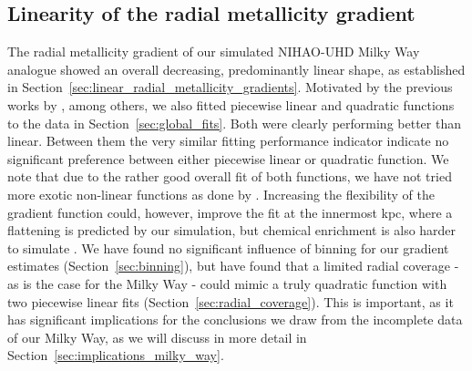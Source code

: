 \documentclass[fleqn,usenatbib]{mnras}
\begin{document}
\subsection{Linearity of the radial metallicity gradient} \label{sec:discussion_linearity}

The radial metallicity gradient of our simulated NIHAO-UHD Milky Way analogue showed an overall decreasing, predominantly linear shape, as established in Section~\ref{sec:linear_radial_metallicity_gradients}. Motivated by the previous works by \citet{SanchezMenguiano2016}, among others, we also fitted piecewise linear and quadratic functions to the data in Section~\ref{sec:global_fits}. Both were clearly performing better than linear. Between them the very similar fitting performance indicator indicate no significant preference between either piecewise linear or quadratic function. We note that due to the rather good overall fit of both functions, we have not tried more exotic non-linear functions as done by \citet{Scarano2013}. Increasing the flexibility of the gradient function could, however, improve the fit at the innermost kpc, where a flattening is predicted by our simulation, but chemical enrichment is also harder to simulate \citep[see also][]{Minchev2013}. We have found no significant influence of binning for our gradient estimates (Section~\ref{sec:binning}), but have found that a limited radial coverage - as is the case for the Milky Way - could mimic a truly quadratic function with two piecewise linear fits (Section~\ref{sec:radial_coverage}). This is important, as it has significant implications for the conclusions we draw from the incomplete data of our Milky Way, as we will discuss in more detail in Section~\ref{sec:implications_milky_way}.
\end{document}
